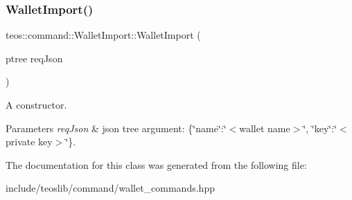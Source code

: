 \subsubsection{\texorpdfstring{Wallet\+Import()}{WalletImport()}\hspace{0.1cm}{\footnotesize\ttfamily [2/2]}}
{\footnotesize\ttfamily teos\+::command\+::\+Wallet\+Import\+::\+Wallet\+Import (\begin{DoxyParamCaption}\item[{ptree}]{req\+Json }\end{DoxyParamCaption})\hspace{0.3cm}{\ttfamily [inline]}}



A constructor. 


\begin{DoxyParams}{Parameters}
{\em req\+Json} & json tree argument\+: \{\char`\"{}name\char`\"{}\+:\char`\"{}$<$wallet name$>$\char`\"{}, \char`\"{}key\char`\"{}\+:\char`\"{}$<$private key$>$\char`\"{}\}. \\
\hline
\end{DoxyParams}


The documentation for this class was generated from the following file\+:\begin{DoxyCompactItemize}
\item 
include/teoslib/command/wallet\+\_\+commands.\+hpp\end{DoxyCompactItemize}

